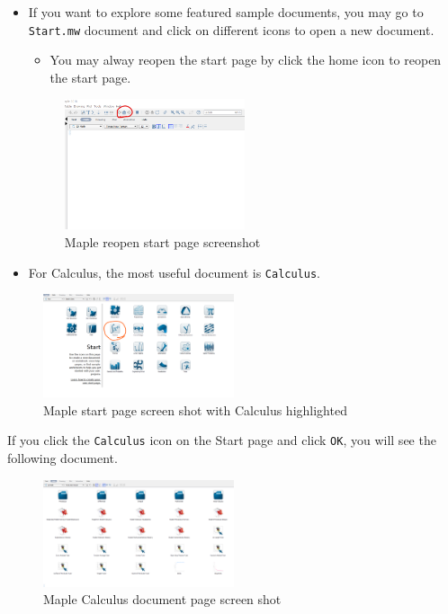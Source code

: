 \documentclass[en,11pt,simple]{elegantbook}
\providecommand{\tightlist}{%
  \setlength{\itemsep}{0pt}\setlength{\parskip}{0pt}}
\begin{document}
\begin{itemize}
\item
  If you want to explore some featured sample documents, you may go to \texttt{Start.mw} document and click on different icons to open a new document.

  \begin{itemize}
  \tightlist
  \item
    You may alway reopen the start page by click the home icon to reopen the start page.
  \end{itemize}

  \begin{figure}
  \centering
  \includegraphics[width=0.5\textwidth,height=\textheight]{figs/Home-reopen-start-page.png}
  \caption{Maple reopen start page screenshot}
  \end{figure}
\item
  For Calculus, the most useful document is \texttt{Calculus}.
\end{itemize}

\begin{figure}
\centering
\includegraphics[width=0.5\textwidth,height=\textheight]{figs/Start-Page-Calculus.png}
\caption{Maple start page screen shot with Calculus highlighted}
\end{figure}

If you click the \texttt{Calculus} icon on the Start page and click \texttt{OK}, you will see the following document.

\begin{figure}
\centering
\includegraphics[width=0.5\textwidth,height=\textheight]{figs/Calculus-Doc.png}
\caption{Maple Calculus document page screen shot}
\end{figure}
\end{document}
